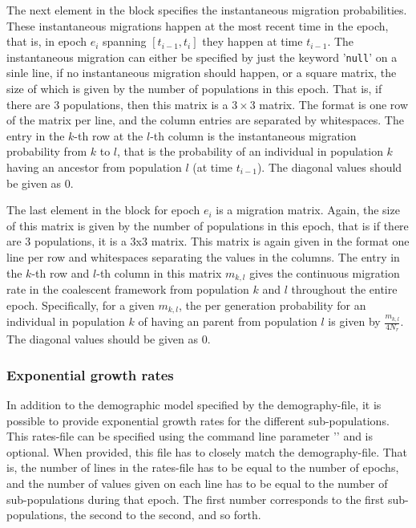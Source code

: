 \documentclass{article}
\numberwithin{equation}{section}
\begin{document}
The next element in the block specifies the instantaneous migration probabilities. These instantaneous migrations happen at the most recent time in the epoch, that is, in epoch $e_i$ spanning $[t_{i-1},t_{i}]$ they happen at time $t_{i-1}$. The instantaneous migration can either be specified by just the keyword '\texttt{null}' on a sinle line, if no instantaneous migration should happen, or a square matrix, the size of which is given by the number of populations in this epoch. That is, if there are 3 populations, then this matrix is a $3\times 3$ matrix. The format is one row of the matrix per line, and the column entries are separated by whitespaces. The entry in the $k$-th row at the $l$-th column is the instantaneous migration probability from $k$ to $l$, that is the probability of an individual in population $k$ having an ancestor from population $l$ (at time $t_{i-1}$). The diagonal values should be given as 0.

The last element in the block for epoch $e_i$ is a migration matrix. Again, the size of this matrix is given by the number of populations in this epoch, that is if there are 3 populations, it is a 3x3 matrix. This matrix is again given in the format one line per row and whitespaces separating the values in the columns. The entry in the $k$-th row and $l$-th column in this matrix $m_{k,l}$ gives the continuous migration rate in the coalescent framework from population $k$ and $l$ throughout the entire epoch. Specifically, for a given $m_{k,l}$, the per generation probability for an individual in population $k$ of having an parent from population $l$ is given by $\frac{m_{k,l}}{4 N_r}$. The diagonal values should be given as 0.

\subsubsection{Exponential growth rates}
\label{sec_exponential}

In addition to the demographic model specified by the demography-file, it is possible to provide exponential growth rates for the different sub-populations. This rates-file can be specified using the command line parameter '\texttt{}' and is optional. When provided, this file has to closely match the demography-file. That is, the number of lines in the rates-file has to be equal to the number of epochs, and the number of values given on each line has to be equal to the number of sub-populations during that epoch. The first number corresponds to the first sub-populations, the second to the second, and so forth.
\end{document}
